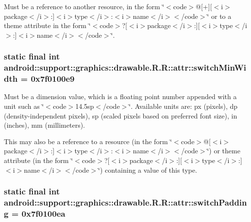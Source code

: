 Must be a reference to another resource, in the form \char`\"{}$<$code$>$@\mbox{[}+\mbox{]}\mbox{[}$<$i$>$package$<$/i$>$:\mbox{]}$<$i$>$type$<$/i$>$:$<$i$>$name$<$/i$>$$<$/code$>$\char`\"{} or to a theme attribute in the form \char`\"{}$<$code$>$?\mbox{[}$<$i$>$package$<$/i$>$:\mbox{]}\mbox{[}$<$i$>$type$<$/i$>$:\mbox{]}$<$i$>$name$<$/i$>$$<$/code$>$\char`\"{}. \hypertarget{classandroid_1_1support_1_1graphics_1_1drawable_1_1_r_1_1attr_4d688b83a54083a8d9114d1f82b1dbf5}{
\subsubsection[{switchMinWidth}]{\setlength{\rightskip}{0pt plus 5cm}static final int android::support::graphics::drawable.R.R::attr::switchMinWidth = 0x7f0100e9}}
\label{classandroid_1_1support_1_1graphics_1_1drawable_1_1_r_1_1attr_4d688b83a54083a8d9114d1f82b1dbf5}


Must be a dimension value, which is a floating point number appended with a unit such as \char`\"{}$<$code$>$14.5sp$<$/code$>$\char`\"{}. Available units are: px (pixels), dp (density-independent pixels), sp (scaled pixels based on preferred font size), in (inches), mm (millimeters). 

This may also be a reference to a resource (in the form \char`\"{}$<$code$>$@\mbox{[}$<$i$>$package$<$/i$>$:\mbox{]}$<$i$>$type$<$/i$>$:$<$i$>$name$<$/i$>$$<$/code$>$\char`\"{}) or theme attribute (in the form \char`\"{}$<$code$>$?\mbox{[}$<$i$>$package$<$/i$>$:\mbox{]}\mbox{[}$<$i$>$type$<$/i$>$:\mbox{]}$<$i$>$name$<$/i$>$$<$/code$>$\char`\"{}) containing a value of this type. \hypertarget{classandroid_1_1support_1_1graphics_1_1drawable_1_1_r_1_1attr_95b3b0970d23cb3b858bcc2ffb09e4b3}{
\subsubsection[{switchPadding}]{\setlength{\rightskip}{0pt plus 5cm}static final int android::support::graphics::drawable.R.R::attr::switchPadding = 0x7f0100ea}}
\label{classandroid_1_1support_1_1graphics_1_1drawable_1_1_r_1_1attr_95b3b0970d23cb3b858bcc2ffb09e4b3}


